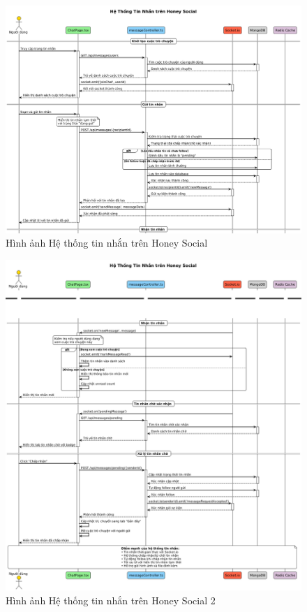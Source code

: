 \begin{figure}[H]
    \centering
    \includegraphics[width=1\textwidth]{image/sequence/message1.png}
    \caption{Hình ảnh Hệ thống tin nhắn trên Honey Social}
    \label{fig:message}
\end{figure}


\begin{figure}[H]
    \centering
    \includegraphics[width=1\textwidth]{image/sequence/message2.png}
    \caption{Hình ảnh Hệ thống tin nhắn trên Honey Social 2}
    \label{fig:message}
\end{figure}





